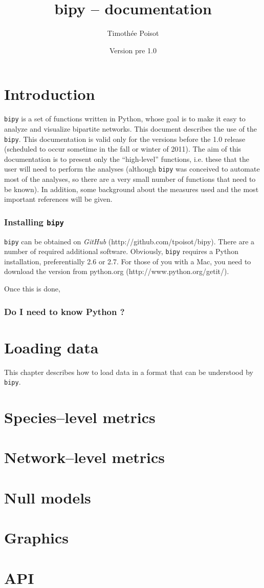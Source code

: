 \documentclass[nols,b5paper]{tufte-book}
\title{bipy -- documentation}
\author{Timothée Poisot}
\date{Version pre 1.0}
\begin{document}
\maketitle
\tableofcontents

\chapter{Introduction}

\texttt{bipy} is a set of functions written in Python, whose goal is to make it easy to analyze and visualize bipartite networks. This document describes the use of the \texttt{bipy}. This documentation is valid only for the versions before the 1.0 release (scheduled to occur sometime in the fall or winter of 2011). The aim of this documentation is to present only the ``high-level'' functions, i.e. these that the user will need to perform the analyses (although \texttt{bipy} was conceived to automate most of the analyses, so there are a very small number of functions that need to be known). In addition, some background about the measures used and the most important references will be given.

\subsection{Installing \texttt{bipy}}

\texttt{bipy} can be obtained on \emph{GitHub} (http://github.com/tpoisot/bipy). There are a number of required additional software. Obviously, \texttt{bipy} requires a Python installation, preferentially 2.6 or 2.7. For those of you with a Mac, you need to download the version from python.org (http://www.python.org/getit/).

Once this is done, 

\subsection{Do I need to know Python ?}


\chapter{Loading data}

This chapter describes how to load data in a format that can be understood by \texttt{bipy}.

\chapter{Species--level metrics}

\chapter{Network--level metrics}

\chapter{Null models}

\chapter{Graphics}

\chapter{API}
\end{document}

